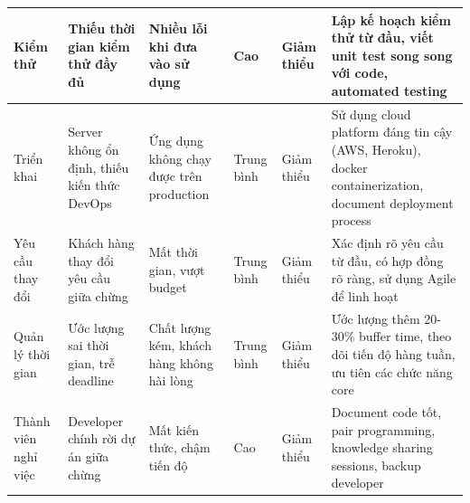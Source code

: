 \begin{table}[h]
\begin{tabular}{|p{2.5cm}|p{2.5cm}|p{2cm}|p{1.8cm}|p{1.8cm}|p{2.5cm}|}
\hline
Kiểm thử & Thiếu thời gian kiểm thử đầy đủ & Nhiều lỗi khi đưa vào sử dụng & Cao & Giảm thiểu & Lập kế hoạch kiểm thử từ đầu, viết unit test song song với code, automated testing \\
\hline
Triển khai & Server không ổn định, thiếu kiến thức DevOps & Ứng dụng không chạy được trên production & Trung bình & Giảm thiểu & Sử dụng cloud platform đáng tin cậy (AWS, Heroku), docker containerization, document deployment process \\
\hline
Yêu cầu thay đổi & Khách hàng thay đổi yêu cầu giữa chừng & Mất thời gian, vượt budget & Trung bình & Giảm thiểu & Xác định rõ yêu cầu từ đầu, có hợp đồng rõ ràng, sử dụng Agile để linh hoạt \\
\hline
Quản lý thời gian & Ước lượng sai thời gian, trễ deadline & Chất lượng kém, khách hàng không hài lòng & Trung bình & Giảm thiểu & Ước lượng thêm 20-30\% buffer time, theo dõi tiến độ hàng tuần, ưu tiên các chức năng core \\
\hline
Thành viên nghỉ việc & Developer chính rời dự án giữa chừng & Mất kiến thức, chậm tiến độ & Cao & Giảm thiểu & Document code tốt, pair programming, knowledge sharing sessions, backup developer \\
\hline
\end{tabular}
\end{table}
